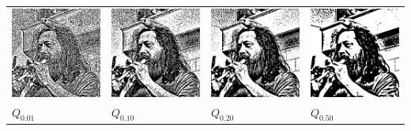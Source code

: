 \begin{tabular}{llll}
	\includegraphics{weiro-q01.png} &
	\includegraphics{weiro-q10.png} &
	\includegraphics{weiro-q20.png} &
	\includegraphics{weiro-q50.png} \\
	$Q_{0.01}$ &
	$Q_{0.10}$ &
	$Q_{0.20}$ &
	$Q_{0.50}$
\end{tabular}

